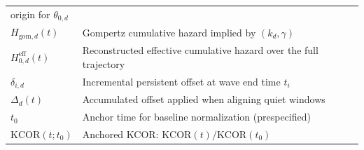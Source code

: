 \documentclass[
]{article}
\begin{document}
\begin{longtable}[]{@{}
  >{\raggedright\arraybackslash}p{}
  >{\raggedright\arraybackslash}p{}@{}}
origin for \(\theta_{0,d}\) \\
\(H_{\mathrm{gom},d}(t)\) & Gompertz cumulative hazard implied by
\((k_d,\gamma)\) \\
\(H_{0,d}^{\mathrm{eff}}(t)\) & Reconstructed effective cumulative
hazard over the full trajectory \\
\(\delta_{i,d}\) & Incremental persistent offset at wave end time
\(t_i\) \\
\(\Delta_d(t)\) & Accumulated offset applied when aligning quiet
windows \\
\(t_0\) & Anchor time for baseline normalization (prespecified) \\
\(\mathrm{KCOR}(t; t_0)\) & Anchored KCOR:
\(\mathrm{KCOR}(t)/\mathrm{KCOR}(t_0)\) \\
\end{longtable}

\newpage
\end{document}
